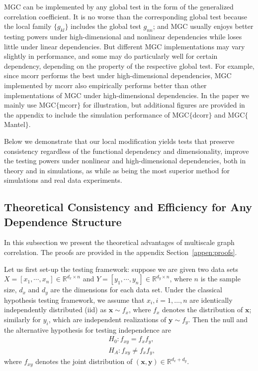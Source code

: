 \documentclass[11pt]{article}
\providecommand{\mb}[1]{\boldsymbol{#1}}
\newcommand{\Real}{\mathbb{R}}
\begin{document}
MGC can be implemented by any global test in the form of the generalized correlation coefficient. It is no worse than the corresponding global test because the local family $\{g_{kl}\}$ includes the global test $g_{nn}$; and MGC usually enjoys better testing powers under high-dimensional and nonlinear dependencies while loses little under linear dependencies. But different MGC implementations may vary slightly in performance, and some may do particularly well for certain dependency, depending on the property of the respective global test. For example, since mcorr performs the best under high-dimensional dependencies, MGC implemented by mcorr also empirically performs better than other implementations of MGC under high-dimensional dependencies. In the paper we mainly use MGC$\{$mcorr$\}$ for illustration, but additional figures are provided in the appendix to include the simulation performance of MGC$\{$dcorr$\}$ and MGC$\{$Mantel$\}$. 

Below we demonstrate that our local modification yields tests that preserve consistency regardless of the functional dependency and dimensionality, improve the testing powers under nonlinear and high-dimensional dependencies, both in theory and in simulations, as while as being the most superior method for simulations and real data experiments.


\subsection{Theoretical Consistency and Efficiency for Any Dependence Structure}
\label{main2}
In this subsection we present the theoretical advantages of multiscale graph correlation. The proofs are provided in the appendix Section~\ref{appen:proofs}. 

Let us first set-up the testing framework: suppose we are given two data sets $X=[x_{1},\cdots, x_{n}] \in \Real^{d_{x} \times n}$ and $Y=[y_{1},\cdots, y_{n}] \in \Real^{d_{y} \times n}$, where $n$ is the sample size, $d_{x}$ and $d_{y}$ are the dimensions for each data set. Under the classical hypothesis testing framework, we assume that $x_{i}, i=1,\ldots,n$ are identically independently distributed (iid) as $\mb{x} \sim f_{x}$, where $f_{x}$ denotes the distribution of $\mb{x}$; similarly for $y_{i}$, which are independent realizations of $\mb{y} \sim f_{y}$. Then the null and the alternative hypothesis for testing independence are
\begin{align*}
& H_{0}: f_{xy}=f_{x}f_{y},\\
& H_{A}: f_{xy} \neq f_{x}f_{y},
\end{align*}
where $f_{xy}$ denotes the joint distribution of $(\mb{x},\mb{y}) \in \Real^{d_{x} + d_{y}}$. 
\end{document}
